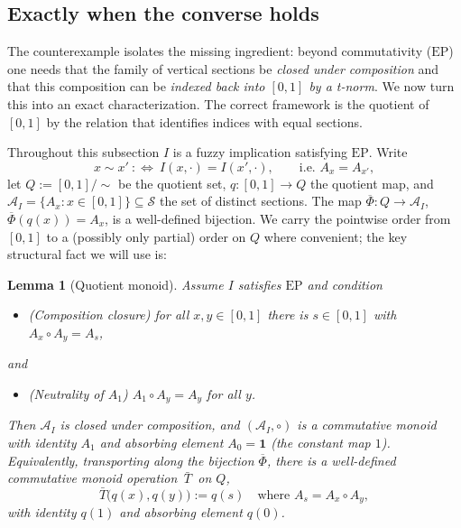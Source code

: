 \documentclass{amsart}
\newtheorem{lemma}{Lemma}
\theoremstyle{definition}
\theoremstyle{remark}
\newcommand{\zo}{[0,1]}
\newcommand{\EP}{\mathrm{EP}}
\newcommand{\Ax}{A}
\begin{document}
\subsection{Exactly when the converse holds}

The counterexample isolates the missing ingredient: beyond commutativity ($\EP$) one
needs that the family of vertical sections be \emph{closed under composition} and that this
composition can be \emph{indexed back into $\zo$ by a t-norm}. We now turn this into an exact
characterization. The correct framework is the quotient of $\zo$ by the relation that
identifies indices with equal sections.

Throughout this subsection $I$ is a fuzzy implication satisfying $\EP$. Write
\[
x\sim x'\ :\Longleftrightarrow\ I(x,\cdot)=I(x',\cdot),\qquad\text{i.e. }\Ax_x=\Ax_{x'} ,
\]
let $Q:=\zo/\!\sim$ be the quotient set, $q\colon\zo\to Q$ the quotient map, and
$\mathcal A_I=\{\Ax_x:x\in\zo\}\subseteq\mathcal S$ the set of distinct sections. The map
$\overline\Phi\colon Q\to\mathcal A_I$, $\overline\Phi(q(x))=\Ax_x$, is a well-defined
bijection. We carry the pointwise order from $\zo$ to a (possibly only partial) order on $Q$
where convenient; the key structural fact we will use is:

\begin{lemma}[Quotient monoid]\label{lem:quotient}
Assume $I$ satisfies $\EP$ and condition
\begin{itemize}
\item[\textnormal{(C1)}] \emph{(Composition closure)} for all $x,y\in\zo$ there is $s\in\zo$
with $\Ax_x\circ\Ax_y=\Ax_s$,
\end{itemize}
and
\begin{itemize}
\item[\textnormal{(C2)}] \emph{(Neutrality of $\Ax_1$)} $\Ax_1\circ\Ax_y=\Ax_y$ for all $y$.
\end{itemize}
Then $\mathcal A_I$ is closed under composition, and $(\mathcal A_I,\circ)$ is a commutative
monoid with identity $\Ax_1$ and absorbing element $\Ax_0=\mathbf 1$ (the constant map $1$).
Equivalently, transporting along the bijection $\overline\Phi$, there is a well-defined
commutative monoid operation $\,\bar T\,$ on $Q$,
\begin{equation}\label{eq:Tbar}
\bar T\bigl(q(x),q(y)\bigr):=q(s)\quad\text{where }\Ax_s=\Ax_x\circ\Ax_y ,
\end{equation}
with identity $q(1)$ and absorbing element $q(0)$.
\end{lemma}
\end{document}
